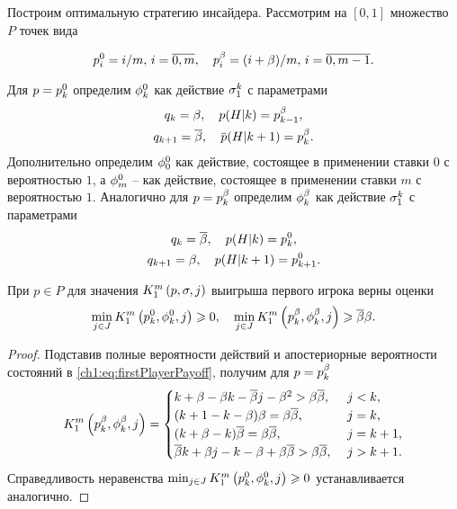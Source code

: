 {Построим оптимальную стратегию инсайдера. Рассмотрим на $[0,1]$ множество $P$
точек вида

\[
\pEven[i] = i/m, \, i = \overline{0, m}, \quad \pOdd[i] = (i + \Co)/m, \, i =
\overline{0, m - 1}.
\]

Для $p = \pEven$ определим $\fEven$ как действие $\fGeneral{k}$ с параметрами
\begin{gather*}
  q_k = \Co, \quad p(H|k) = \pOdd[k-1],\\
  q_{k+1} = \DCo, \quad \p(H|k + 1) = \pOdd[k].
\end{gather*}
Дополнительно определим $\fEven[0]$ как действие, состоящее в применении ставки
$0$ с вероятностью $1$, а $\fEven[m]$ -- как действие, состоящее в применении
ставки $m$ с вероятностью $1$. Аналогично для $p = \pOdd$ определим $\fOdd$ как
действие $\fGeneral{k}$ с параметрами
\begin{gather*}
  q_k = \DCo, \quad p(H|k) = \pEven[k],\\
  q_{k+1} = \Co, \quad p(H|k + 1) = \pEven[k+1].
\end{gather*}

\begin{proposition}
  При $p \in P$ для значения $\firstPlayerPayoff{1}{p}{\sigma}{j}$ выигрыша
  первого игрока верны оценки
  \begin{equation}
    \label{ch1:eq:lowerBound:inequalities}
    \min_{j \in J}
    \firstPlayerPayoff{1}{\pEven}{\fEven}{j} \geq 0,
    \quad
    \min_{j \in J}
    \firstPlayerPayoff{1}{\pOdd}{\fOdd}{j} \geq \DCo\Co.
  \end{equation}
\end{proposition}
\begin{proof}
  Подставив полные вероятности действий и апостериорные вероятности состояний в
  \eqref{ch1:eq:firstPlayerPayoff}, получим для $p = \pOdd[k]$
  \begin{equation*}
    \firstPlayerPayoff{1}{\pOdd}{\fOdd}{j} = \begin{cases}
      k + \Co - \Co k - \DCo j - \Co^2 > \Co \DCo,\ & j < k,\\
      (k + 1 - k - \Co) \Co = \Co \DCo,\ & j = k,\\
      (k + \Co - k) \DCo = \Co \DCo,\ & j = k+1,\\
      \DCo k + \Co j - k - \Co + \Co \DCo > \Co \DCo,\ & j > k+1.
    \end{cases}
  \end{equation*}
  Справедливость неравенства %
  $\min_{j \in J} \firstPlayerPayoff{1}{\pEven}{\fEven}{j} \geq 0$ %
  устанавливается аналогично.
\end{proof}

}
